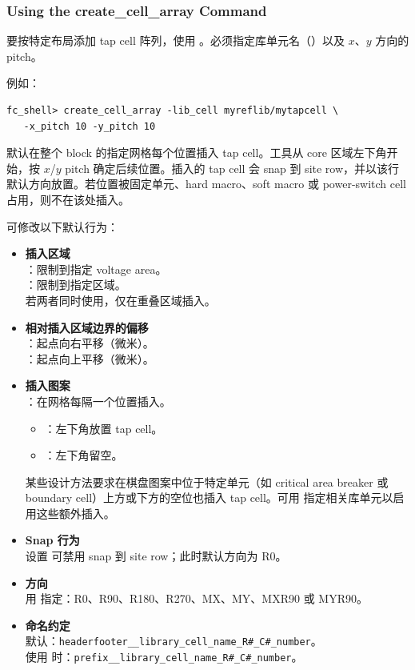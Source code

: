 \subsubsection*{Using the create\_cell\_array Command}

要按特定布局添加 tap cell 阵列，使用 。必须指定库单元名（）以及 $x$、$y$ 方向的 pitch。

例如：
\begin{lstlisting}
fc_shell> create_cell_array -lib_cell myreflib/mytapcell \
   -x_pitch 10 -y_pitch 10
\end{lstlisting}

默认在整个 block 的指定网格每个位置插入 tap cell。工具从 core 区域左下角开始，按 $x$/$y$ pitch 确定后续位置。插入的 tap cell 会 snap 到 site row，并以该行默认方向放置。若位置被固定单元、hard macro、soft macro 或 power-switch cell 占用，则不在该处插入。

可修改以下默认行为：
\begin{itemize}
  \item \textbf{插入区域}\\
        ：限制到指定 voltage area。\\
        ：限制到指定区域。\\
        若两者同时使用，仅在重叠区域插入。
  \item \textbf{相对插入区域边界的偏移}\\
        ：起点向右平移（微米）。\\
        ：起点向上平移（微米）。
  \item \textbf{插入图案}\\
        ：在网格每隔一个位置插入。
        \begin{itemize}
          \item {}：左下角放置 tap cell。
          \item {}：左下角留空。
        \end{itemize}
        某些设计方法要求在棋盘图案中位于特定单元（如 critical area breaker 或 boundary cell）上方或下方的空位也插入 tap cell。可用  指定相关库单元以启用这些额外插入。
  \item \textbf{Snap 行为}\\
        设置  可禁用 snap 到 site row；此时默认方向为 R0。
  \item \textbf{方向}\\
        用  指定：R0、R90、R180、R270、MX、MY、MXR90 或 MYR90。
  \item \textbf{命名约定}\\
        默认：\texttt{headerfooter\_\_library\_cell\_name\_R\#\_C\#\_number}。\\
        使用 \opt{-prefix} 时：\texttt{prefix\_\_library\_cell\_name\_R\#\_C\#\_number}。
\end{itemize}

